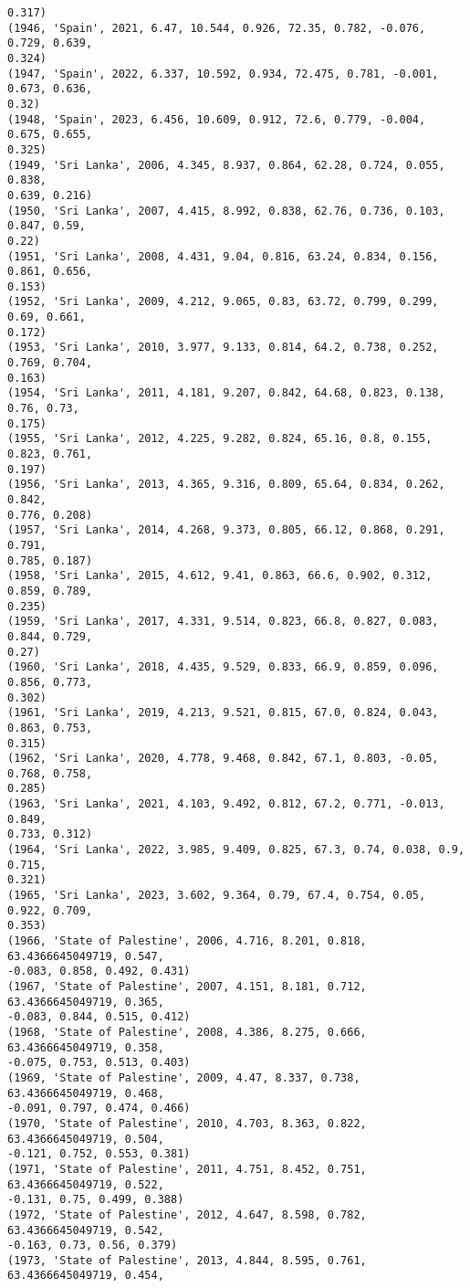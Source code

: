 \documentclass[11pt]{article}
\begin{document}
\begin{Verbatim}[commandchars=\\\{\}]
0.317)
(1946, 'Spain', 2021, 6.47, 10.544, 0.926, 72.35, 0.782, -0.076, 0.729, 0.639,
0.324)
(1947, 'Spain', 2022, 6.337, 10.592, 0.934, 72.475, 0.781, -0.001, 0.673, 0.636,
0.32)
(1948, 'Spain', 2023, 6.456, 10.609, 0.912, 72.6, 0.779, -0.004, 0.675, 0.655,
0.325)
(1949, 'Sri Lanka', 2006, 4.345, 8.937, 0.864, 62.28, 0.724, 0.055, 0.838,
0.639, 0.216)
(1950, 'Sri Lanka', 2007, 4.415, 8.992, 0.838, 62.76, 0.736, 0.103, 0.847, 0.59,
0.22)
(1951, 'Sri Lanka', 2008, 4.431, 9.04, 0.816, 63.24, 0.834, 0.156, 0.861, 0.656,
0.153)
(1952, 'Sri Lanka', 2009, 4.212, 9.065, 0.83, 63.72, 0.799, 0.299, 0.69, 0.661,
0.172)
(1953, 'Sri Lanka', 2010, 3.977, 9.133, 0.814, 64.2, 0.738, 0.252, 0.769, 0.704,
0.163)
(1954, 'Sri Lanka', 2011, 4.181, 9.207, 0.842, 64.68, 0.823, 0.138, 0.76, 0.73,
0.175)
(1955, 'Sri Lanka', 2012, 4.225, 9.282, 0.824, 65.16, 0.8, 0.155, 0.823, 0.761,
0.197)
(1956, 'Sri Lanka', 2013, 4.365, 9.316, 0.809, 65.64, 0.834, 0.262, 0.842,
0.776, 0.208)
(1957, 'Sri Lanka', 2014, 4.268, 9.373, 0.805, 66.12, 0.868, 0.291, 0.791,
0.785, 0.187)
(1958, 'Sri Lanka', 2015, 4.612, 9.41, 0.863, 66.6, 0.902, 0.312, 0.859, 0.789,
0.235)
(1959, 'Sri Lanka', 2017, 4.331, 9.514, 0.823, 66.8, 0.827, 0.083, 0.844, 0.729,
0.27)
(1960, 'Sri Lanka', 2018, 4.435, 9.529, 0.833, 66.9, 0.859, 0.096, 0.856, 0.773,
0.302)
(1961, 'Sri Lanka', 2019, 4.213, 9.521, 0.815, 67.0, 0.824, 0.043, 0.863, 0.753,
0.315)
(1962, 'Sri Lanka', 2020, 4.778, 9.468, 0.842, 67.1, 0.803, -0.05, 0.768, 0.758,
0.285)
(1963, 'Sri Lanka', 2021, 4.103, 9.492, 0.812, 67.2, 0.771, -0.013, 0.849,
0.733, 0.312)
(1964, 'Sri Lanka', 2022, 3.985, 9.409, 0.825, 67.3, 0.74, 0.038, 0.9, 0.715,
0.321)
(1965, 'Sri Lanka', 2023, 3.602, 9.364, 0.79, 67.4, 0.754, 0.05, 0.922, 0.709,
0.353)
(1966, 'State of Palestine', 2006, 4.716, 8.201, 0.818, 63.4366645049719, 0.547,
-0.083, 0.858, 0.492, 0.431)
(1967, 'State of Palestine', 2007, 4.151, 8.181, 0.712, 63.4366645049719, 0.365,
-0.083, 0.844, 0.515, 0.412)
(1968, 'State of Palestine', 2008, 4.386, 8.275, 0.666, 63.4366645049719, 0.358,
-0.075, 0.753, 0.513, 0.403)
(1969, 'State of Palestine', 2009, 4.47, 8.337, 0.738, 63.4366645049719, 0.468,
-0.091, 0.797, 0.474, 0.466)
(1970, 'State of Palestine', 2010, 4.703, 8.363, 0.822, 63.4366645049719, 0.504,
-0.121, 0.752, 0.553, 0.381)
(1971, 'State of Palestine', 2011, 4.751, 8.452, 0.751, 63.4366645049719, 0.522,
-0.131, 0.75, 0.499, 0.388)
(1972, 'State of Palestine', 2012, 4.647, 8.598, 0.782, 63.4366645049719, 0.542,
-0.163, 0.73, 0.56, 0.379)
(1973, 'State of Palestine', 2013, 4.844, 8.595, 0.761, 63.4366645049719, 0.454,

\end{Verbatim}
\end{document}
